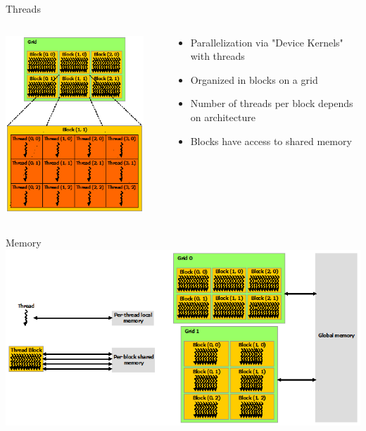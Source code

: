 \documentclass{beamer}
\begin{document}
\begin{frame}{Threads}
	\begin{columns}
		\begin{column}{0.45\textwidth}
			\centering \includegraphics[width=0.9\textwidth]{cuda_threads.png}
		\end{column}
		\begin{column}{0.55\textwidth}
			\begin{itemize}
				\item Parallelization via "Device Kernels" with threads
				\item Organized in blocks on a grid
				\item Number of threads per block depends on architecture
				\item Blocks have access to shared memory
			\end{itemize}
		\end{column}
	\end{columns}
\end{frame}

\begin{frame}{Memory}
	\includegraphics[width=1.0\textwidth]{cuda_memory.png}
\end{frame}
\end{document}
